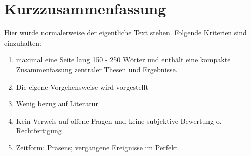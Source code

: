 \section*{Kurzzusammenfassung}\label{sec:kurzzusammenfassung}


Hier würde normalerweise der eigentliche Text stehen. Folgende Kriterien sind einzuhalten:

 \begin{enumerate}
 	\item maximal eine Seite lang 150 - 250 Wörter und enthält eine kompakte Zusammenfassung zentraler Thesen und Ergebnisse.
 	\item Die eigene Vorgehensweise wird vorgestellt
 	\item Wenig bezug auf Literatur 
 	\item Kein Verweis auf offene Fragen und keine subjektive Bewertung o. Rechtfertigung
 	\item Zeitform: Präsens; vergangene Ereignisse im Perfekt
 \end{enumerate}

